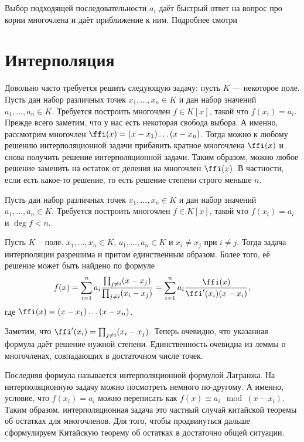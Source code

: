 Выбор подходящей последовательности $a_i$ даёт быстрый ответ на вопрос про корни многочлена и даёт приближение к ним. Подробнее смотри \cite[стр 56-61]{McNamee}







\section{Интерполяция}

Довольно часто требуется решить следующую задачу: пусть $K$ --- некоторое поле. Пусть дан набор различных точек
$x_1,\dots, x_n \in K$ и дан набор значений $a_1,\dots,a_n\in K$. Требуется построить многочлен $f\in K[x]$, такой что $f(x_i)=a_i$.
Прежде всего заметим, что у нас есть некоторая свобода выбора. А именно, рассмотрим многочлен $\ffi(x)=(x-x_1)\dots(x-x_n)$. Тогда можно к любому решению интерполяционной задачи прибавить кратное многочлена $\ffi(x)$ и снова получить решение интерполяционной задачи. Таким образом, можно любое решение заменить на остаток от деления на многочлен $\ffi(x)$. В частности, если есть какое-то решение, то есть решение степени строго меньше $n$.

 Пусть дан набор различных точек $x_1,\dots,x_n\in K$ и дан набор значений
$a_1,\dots, a_n\in K$. Требуется построить многочлен $f\in K[x]$, такой что $f(x_i)=a_i$ и $\deg f < n$.
\edfn

\thrm Пусть $K$ -- поле. $x_1,\dots,x_n \in K$, $a_1,\dots,a_n \in K$ и $x_i\neq x_j$ при $i\neq j$. Тогда задача интерполяции разрешима и притом единственным образом. Более того, её решение может быть найдено по формуле
$$f(x)=\sum_{i=1}^n a_i\frac{\prod_{j\neq i}(x-x_j)}{\prod_{j\neq i } (x_i-x_j)}=\sum_{i=1}^n a_i\frac{\ffi(x)}{\ffi'(x_i)(x-x_i)},$$
где $\ffi(x)=(x-x_1)\dots(x-x_n)$.
\ethrm

\proof Заметим, что $\ffi'(x_i)=\prod_{j\neq i}(x_i-x_j)$. Теперь очевидно, что указанная формула даёт решение нужной степени. Единственность очевидна из леммы о многочленах, совпадающих в достаточном числе точек.
\endproof

Последняя формула называется интерполяционной формулой Лагранжа. На интерполяционную задачу можно посмотреть немного по-другому. А именно, условие, что $f(x_i)=a_i$ можно переписать как $f(x)\equiv a_i \mod (x-x_i)$. Таким образом, интерполяционная задача это частный случай китайской теоремы об остатках для многочленов. Для того, чтобы продвинуться дальше сформулируем Китайскую теорему об остатках в достаточно общей ситуации. 


